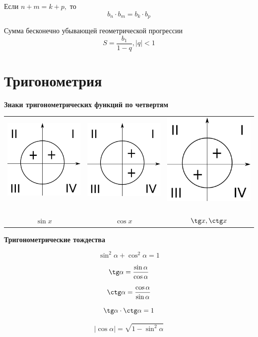 \documentclass[a5paper, 8pt]{extarticle}
\begin{document}
Если $n+m=k+p,$ то
$$b_n\cdot b_m=b_k\cdot b_p$$

Сумма бесконечно убывающей геометрической прогрессии
$$S=\frac{b_1}{1-q}, |q|<1$$

\section{Тригонометрия}

\textbf{Знаки тригонометрических функций по четвертям}

\begin{center}
\begin{tabular}{ccc}
\includegraphics[width=0.25\linewidth]{img01.png} \ & \includegraphics[width=0.25\linewidth]{img02.png} \ & \includegraphics[width=0.25\linewidth]{img03.png} \ \\ 
$\sin x$ & $\cos x$ & $\tg x, \ctg x$ \\ 
\end{tabular} 
\end{center}

\textbf{Тригонометрические тождества}

$$\sin^2\alpha+\cos^2\alpha=1$$

$$\tg\alpha =\frac{\sin\alpha}{\cos\alpha}$$

$$\ctg\alpha =\frac{\cos\alpha}{\sin\alpha}$$

$$\tg\alpha \cdot \ctg\alpha = 1$$

$$|\cos \alpha |=\sqrt{1-\sin^2\alpha}$$
\end{document}
